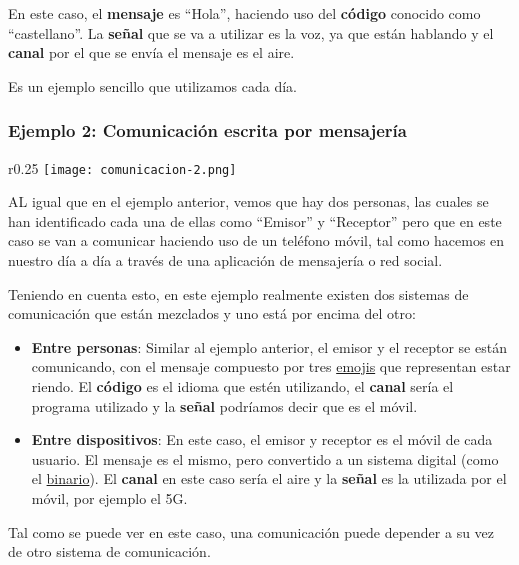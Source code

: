 En este caso, el \textbf{mensaje} es “Hola”, haciendo uso del \textbf{código} conocido como “castellano”. La \textbf{señal} que se va a utilizar es la voz, ya que están hablando y el \textbf{canal} por el que se envía el mensaje es el aire.

Es un ejemplo sencillo que utilizamos cada día.

\subsubsection*{Ejemplo 2: Comunicación escrita por mensajería}

\begin{wrapfigure}{r}{0.25\linewidth}
    \centering
    \vspace{-35pt}
    \texttt{[image: comunicacion-2.png]}
    \vspace{-30pt}
\end{wrapfigure}
AL igual que en el ejemplo anterior, vemos que hay dos personas, las cuales se han identificado cada una de ellas como “Emisor” y “Receptor” pero que en este caso se van a comunicar haciendo uso de un teléfono móvil, tal como hacemos en nuestro día a día a través de una aplicación de mensajería o red social.

Teniendo en cuenta esto, en este ejemplo realmente existen dos sistemas de comunicación que están mezclados y uno está por encima del otro:

\begin{itemize}
    \item \textbf{Entre personas}: Similar al ejemplo anterior, el emisor y el receptor se están comunicando, con el mensaje compuesto por tres \href{https://es.wikipedia.org/wiki/Emoji}{emojis} que representan estar riendo. El \textbf{código} es el idioma que estén utilizando, el \textbf{canal} sería el programa utilizado y la \textbf{señal} podríamos decir que es el móvil.

    \item \textbf{Entre dispositivos}: En este caso, el emisor y receptor es el móvil de cada usuario. El mensaje es el mismo, pero convertido a un sistema digital (como el \hyperlink{binario}{binario}). El \textbf{canal} en este caso sería el aire y la \textbf{señal} es la utilizada por el móvil, por ejemplo el 5G.
\end{itemize}

Tal como se puede ver en este caso, una comunicación puede depender a su vez de otro sistema de comunicación.

